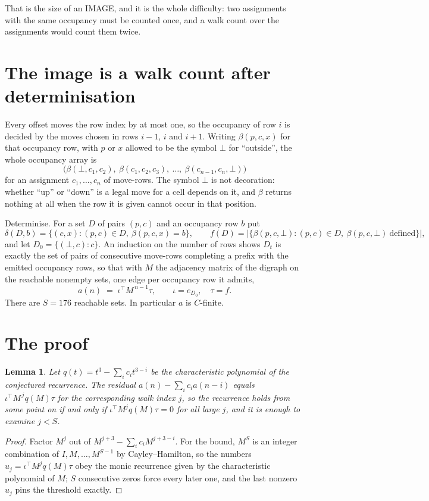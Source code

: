 \documentclass[11pt,a4paper]{article}
\theoremstyle{plain}
\newtheorem{lemma}[theorem]{Lemma}
\theoremstyle{definition}
\begin{document}
That is the size of an IMAGE, and it is the whole difficulty: two assignments with the same
occupancy must be counted once, and a walk count over the assignments would count them twice.

\section{The image is a walk count after determinisation}

Every offset moves the row index by at most one, so the occupancy of row $i$ is decided by the
moves chosen in rows $i-1$, $i$ and $i+1$. Writing $\beta(p,c,x)$ for that occupancy row, with
$p$ or $x$ allowed to be the symbol $\bot$ for ``outside'', the whole occupancy array is
\[
\bigl(\beta(\bot,c_1,c_2),\ \beta(c_1,c_2,c_3),\ \dots,\ \beta(c_{n-1},c_n,\bot)\bigr)
\]
for an assignment $c_1,\dots,c_n$ of move-rows. The symbol $\bot$ is not decoration: whether
``up'' or ``down'' is a legal move for a cell depends on it, and $\beta$ returns nothing at all
when the row it is given cannot occur in that position.

Determinise. For a set $D$ of pairs $(p,c)$ and an occupancy row $b$ put
\[
\delta(D,b)=\{(c,x):(p,c)\in D,\ \beta(p,c,x)=b\},\qquad
f(D)=\bigl|\{\beta(p,c,\bot):(p,c)\in D,\ \beta(p,c,\bot)\ \text{defined}\}\bigr| ,
\]
and let $D_0=\{(\bot,c):c\}$. An induction on the number of rows shows $D_t$ is exactly the
set of pairs of consecutive move-rows completing a prefix with the emitted occupancy rows, so
that with $M$ the adjacency matrix of the digraph on the reachable nonempty sets, one edge per
occupancy row it admits,
\[
a(n)\;=\;\iota^{\!\top}M^{\,n-1}\tau,\qquad \iota=e_{D_0},\quad \tau=f .
\]
There are $S=176$ reachable sets. In particular $a$ is $C$-finite.

\section{The proof}

\begin{lemma}\label{lem:crit}
Let $q(t)=t^{3}-\sum_i c_it^{3-i}$ be the characteristic polynomial of the
conjectured recurrence. The residual $a(n)-\sum_ic_ia(n-i)$ equals
$\iota^{\!\top}M^{\,j}q(M)\tau$ for the corresponding walk index $j$, so the recurrence
holds from some point on if and only if $\iota^{\!\top}M^{j}q(M)\tau=0$ for all large $j$,
and it is enough to examine $j<S$.
\end{lemma}

\begin{proof}
Factor $M^{j}$ out of $M^{j+3}-\sum_ic_iM^{j+3-i}$. For the bound, $M^{S}$
is an integer combination of $I,M,\dots,M^{S-1}$ by Cayley--Hamilton, so the numbers
$u_j=\iota^{\!\top}M^{j}q(M)\tau$ obey the monic recurrence given by the characteristic
polynomial of $M$; $S$ consecutive zeros force every later one, and the last nonzero $u_j$
pins the threshold exactly.
\end{proof}
\end{document}

